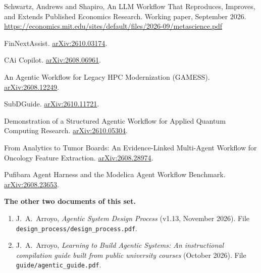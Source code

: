 \documentclass[10pt]{article}
\begin{document}
{\begin{enumerate}[label={[\arabic*]},leftmargin=2.2em]
\item Schwartz, Andrews and Shapiro, An LLM Workflow That Reproduces, Improves, and Extends Published Economics Research. Working paper, September 2026. \url{https://economics.mit.edu/sites/default/files/2026-09/metascience.pdf}
\item FinNextAssist. \href{https://arxiv.org/abs/2610.03174}{arXiv:2610.03174}.
\item CAi Copilot. \href{https://arxiv.org/abs/2608.06961}{arXiv:2608.06961}.
\item An Agentic Workflow for Legacy HPC Modernization (GAMESS). \href{https://arxiv.org/abs/2608.12249}{arXiv:2608.12249}.
\item SubDGuide. \href{https://arxiv.org/abs/2610.11721}{arXiv:2610.11721}.
\item Demonstration of a Structured Agentic Workflow for Applied Quantum Computing Research. \href{https://arxiv.org/abs/2610.05304}{arXiv:2610.05304}.
\item From Analytics to Tumor Boards: An Evidence-Linked Multi-Agent Workflow for Oncology Feature Extraction. \href{https://arxiv.org/abs/2608.28974}{arXiv:2608.28974}.
\item Pufibara Agent Harness and the Modelica Agent Workflow Benchmark. \href{https://arxiv.org/abs/2608.23653}{arXiv:2608.23653}.
\end{enumerate}
}

\textbf{The other two documents of this set.}
{\small
\begin{enumerate}[leftmargin=2.2em]
\item[{[D]}] J.~A.~Arroyo, \emph{Agentic System Design Process} (v1.13, November 2026). File \texttt{design\_process/design\_process.pdf}.
\item[{[G]}] J.~A.~Arroyo, \emph{Learning to Build Agentic Systems: An instructional compilation guide built from public university courses} (October 2026). File \texttt{guide/agentic\_guide.pdf}.
\end{enumerate}
}
\end{document}
